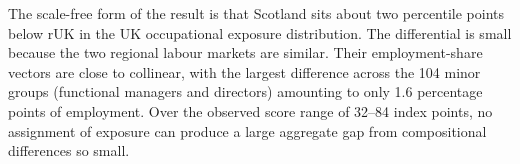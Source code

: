  
The scale-free form of the result is that Scotland sits about two percentile points below rUK in the UK occupational exposure distribution.
The differential is small because the two regional labour markets are similar. Their employment-share vectors are close to collinear, with the largest difference across the 104 minor groups (functional managers and directors) amounting to only 1.6 percentage points of employment.
Over the observed score range of 32--84 index points, no assignment of exposure can produce a large aggregate gap from compositional differences so small. 
 
